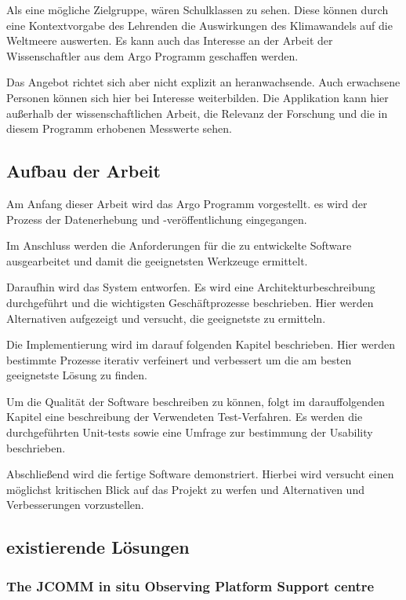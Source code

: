     Als eine mögliche Zielgruppe, wären Schulklassen zu sehen. Diese können durch eine Kontextvorgabe des Lehrenden  die Auswirkungen des Klimawandels auf die Weltmeere auswerten. Es kann auch das Interesse an der Arbeit der Wissenschaftler aus dem Argo Programm geschaffen werden. 

    Das Angebot richtet sich aber nicht explizit an heranwachsende. Auch erwachsene Personen können sich hier bei Interesse weiterbilden. Die Applikation kann hier außerhalb der wissenschaftlichen Arbeit,  die Relevanz der Forschung und die in diesem Programm erhobenen Messwerte sehen. 
    
    
    \subsection{Aufbau der Arbeit}
    
    Am Anfang dieser Arbeit wird das Argo Programm vorgestellt. es wird der Prozess der Datenerhebung und -veröffentlichung eingegangen. 
    
    Im Anschluss werden die Anforderungen für die zu entwickelte Software ausgearbeitet und damit die geeignetsten Werkzeuge ermittelt.
    
    Daraufhin wird das System entworfen. Es wird eine Architekturbeschreibung durchgeführt und die wichtigsten Geschäftprozesse beschrieben. Hier werden Alternativen aufgezeigt und versucht, die geeignetste zu ermitteln.
    
    Die Implementierung wird im darauf folgenden Kapitel beschrieben. Hier werden bestimmte Prozesse iterativ verfeinert und verbessert um die am besten geeignetste Lösung zu finden. 
    
    Um die Qualität der Software beschreiben zu können, folgt im darauffolgenden Kapitel eine beschreibung der Verwendeten Test-Verfahren. Es werden die durchgeführten Unit-tests sowie eine Umfrage zur bestimmung der Usability beschrieben.
    
    
    Abschließend wird die fertige Software demonstriert. Hierbei wird versucht einen möglichst kritischen Blick auf das Projekt zu werfen und Alternativen und Verbesserungen vorzustellen.
    
    
    
    \subsection{existierende Lösungen}
    
    
    \subsubsection{The JCOMM in situ Observing Platform Support centre} 
    
